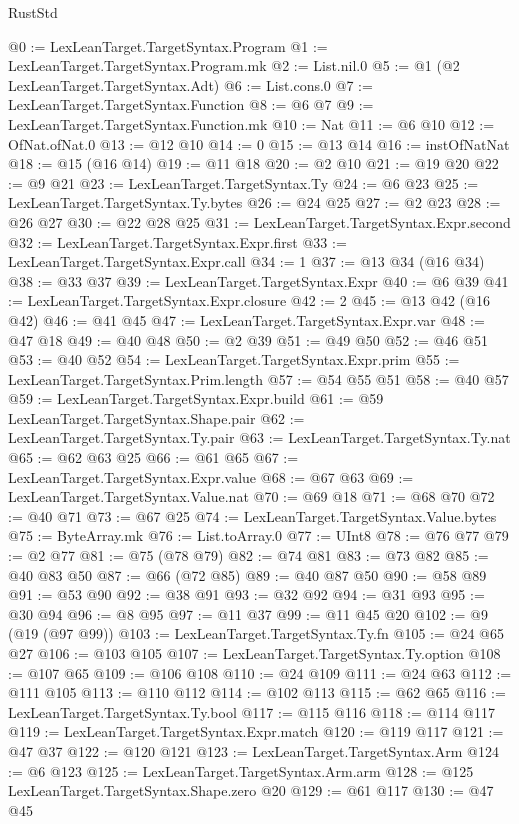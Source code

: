 \begin{lexlean}{RustStd}
\begin{coremodule}
@0 := LexLeanTarget.TargetSyntax.Program
@1 := LexLeanTarget.TargetSyntax.Program.mk
@2 := List.nil.{0}
@5 := @1 (@2 LexLeanTarget.TargetSyntax.Adt)
@6 := List.cons.{0}
@7 := LexLeanTarget.TargetSyntax.Function
@8 := @6 @7
@9 := LexLeanTarget.TargetSyntax.Function.mk
@10 := Nat
@11 := @6 @10
@12 := OfNat.ofNat.{0}
@13 := @12 @10
@14 := 0
@15 := @13 @14
@16 := instOfNatNat
@18 := @15 (@16 @14)
@19 := @11 @18
@20 := @2 @10
@21 := @19 @20
@22 := @9 @21
@23 := LexLeanTarget.TargetSyntax.Ty
@24 := @6 @23
@25 := LexLeanTarget.TargetSyntax.Ty.bytes
@26 := @24 @25
@27 := @2 @23
@28 := @26 @27
@30 := @22 @28 @25
@31 := LexLeanTarget.TargetSyntax.Expr.second
@32 := LexLeanTarget.TargetSyntax.Expr.first
@33 := LexLeanTarget.TargetSyntax.Expr.call
@34 := 1
@37 := @13 @34 (@16 @34)
@38 := @33 @37
@39 := LexLeanTarget.TargetSyntax.Expr
@40 := @6 @39
@41 := LexLeanTarget.TargetSyntax.Expr.closure
@42 := 2
@45 := @13 @42 (@16 @42)
@46 := @41 @45
@47 := LexLeanTarget.TargetSyntax.Expr.var
@48 := @47 @18
@49 := @40 @48
@50 := @2 @39
@51 := @49 @50
@52 := @46 @51
@53 := @40 @52
@54 := LexLeanTarget.TargetSyntax.Expr.prim
@55 := LexLeanTarget.TargetSyntax.Prim.length
@57 := @54 @55 @51
@58 := @40 @57
@59 := LexLeanTarget.TargetSyntax.Expr.build
@61 := @59 LexLeanTarget.TargetSyntax.Shape.pair
@62 := LexLeanTarget.TargetSyntax.Ty.pair
@63 := LexLeanTarget.TargetSyntax.Ty.nat
@65 := @62 @63 @25
@66 := @61 @65
@67 := LexLeanTarget.TargetSyntax.Expr.value
@68 := @67 @63
@69 := LexLeanTarget.TargetSyntax.Value.nat
@70 := @69 @18
@71 := @68 @70
@72 := @40 @71
@73 := @67 @25
@74 := LexLeanTarget.TargetSyntax.Value.bytes
@75 := ByteArray.mk
@76 := List.toArray.{0}
@77 := UInt8
@78 := @76 @77
@79 := @2 @77
@81 := @75 (@78 @79)
@82 := @74 @81
@83 := @73 @82
@85 := @40 @83 @50
@87 := @66 (@72 @85)
@89 := @40 @87 @50
@90 := @58 @89
@91 := @53 @90
@92 := @38 @91
@93 := @32 @92
@94 := @31 @93
@95 := @30 @94
@96 := @8 @95
@97 := @11 @37
@99 := @11 @45 @20
@102 := @9 (@19 (@97 @99))
@103 := LexLeanTarget.TargetSyntax.Ty.fn
@105 := @24 @65 @27
@106 := @103 @105
@107 := LexLeanTarget.TargetSyntax.Ty.option
@108 := @107 @65
@109 := @106 @108
@110 := @24 @109
@111 := @24 @63
@112 := @111 @105
@113 := @110 @112
@114 := @102 @113
@115 := @62 @65
@116 := LexLeanTarget.TargetSyntax.Ty.bool
@117 := @115 @116
@118 := @114 @117
@119 := LexLeanTarget.TargetSyntax.Expr.match
@120 := @119 @117
@121 := @47 @37
@122 := @120 @121
@123 := LexLeanTarget.TargetSyntax.Arm
@124 := @6 @123
@125 := LexLeanTarget.TargetSyntax.Arm.arm
@128 := @125 LexLeanTarget.TargetSyntax.Shape.zero @20
@129 := @61 @117
@130 := @47 @45

\end{coremodule}
\end{lexlean}

